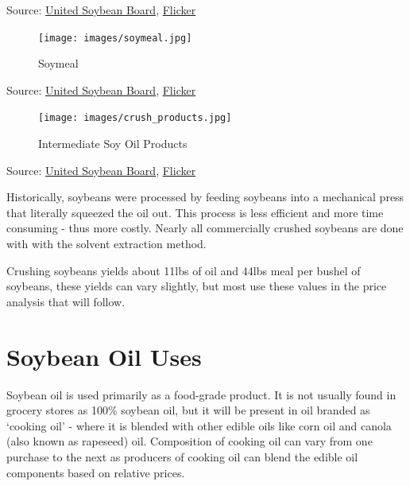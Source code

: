 \documentclass[
  letterpaper,
  DIV=11,
  numbers=noendperiod]{scrreprt}
\begin{document}
Source: \href{http://unitedsoybean.org/}{United Soybean Board},
\href{https://www.flickr.com/photos/unitedsoybean/10059015936/}{Flicker}

\begin{figure}

{\centering \texttt{[image: images/soymeal.jpg]}

}

\caption{Soymeal}

\end{figure}

Source: \href{http://unitedsoybean.org/}{United Soybean Board},
\href{https://www.flickr.com/photos/unitedsoybean/10059074033/}{Flicker}

\begin{figure}

{\centering \texttt{[image: images/crush\_products.jpg]}

}

\caption{Intermediate Soy Oil Products}

\end{figure}

Source: \href{http://unitedsoybean.org/}{United Soybean Board},
\href{https://www.flickr.com/photos/unitedsoybean/10058954054/}{Flicker}

Historically, soybeans were processed by feeding soybeans into a
mechanical press that literally squeezed the oil out. This process is
less efficient and more time consuming - thus more costly. Nearly all
commercially crushed soybeans are done with with the solvent extraction
method.

Crushing soybeans yields about 11lbs of oil and 44lbs meal per bushel of
soybeans, these yields can vary slightly, but most use these values in
the price analysis that will follow.

\hypertarget{soybean-oil-uses}{%
\section{Soybean Oil Uses}\label{soybean-oil-uses}}

Soybean oil is used primarily as a food-grade product. It is not usually
found in grocery stores as 100\% soybean oil, but it will be present in
oil branded as `cooking oil' - where it is blended with other edible
oils like corn oil and canola (also known as rapeseed) oil. Composition
of cooking oil can vary from one purchase to the next as producers of
cooking oil can blend the edible oil components based on relative
prices.
\end{document}
